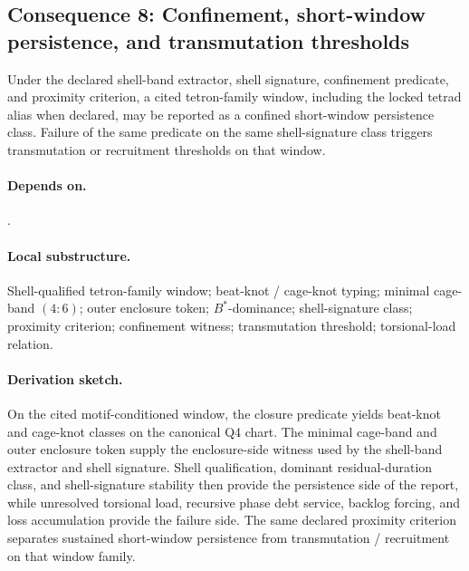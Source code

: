 \subsection{Consequence 8: Confinement, short-window persistence, and transmutation thresholds}
\begin{consequence}\label{cons:c8}
Under the declared shell-band extractor, shell signature, confinement predicate, and proximity criterion, a cited tetron-family window, including the locked tetrad alias when declared, may be reported as a confined short-window persistence class. Failure of the same predicate on the same shell-signature class triggers transmutation or recruitment thresholds on that window.
\end{consequence}
\paragraph{Depends on.} .
\paragraph{Local substructure.} Shell-qualified tetron-family window; beat-knot / cage-knot typing; minimal cage-band $(4{:}6)$; outer enclosure token; $B^*$-dominance; shell-signature class; proximity criterion; confinement witness; transmutation threshold; torsional-load relation.
\paragraph{Derivation sketch.} On the cited motif-conditioned window, the closure predicate yields beat-knot and cage-knot classes on the canonical Q4 chart. The minimal cage-band and outer enclosure token supply the enclosure-side witness used by the shell-band extractor and shell signature. Shell qualification, dominant residual-duration class, and shell-signature stability then provide the persistence side of the report, while unresolved torsional load, recursive phase debt service, backlog forcing, and loss accumulation provide the failure side. The same declared proximity criterion separates sustained short-window persistence from transmutation / recruitment on that window family.

